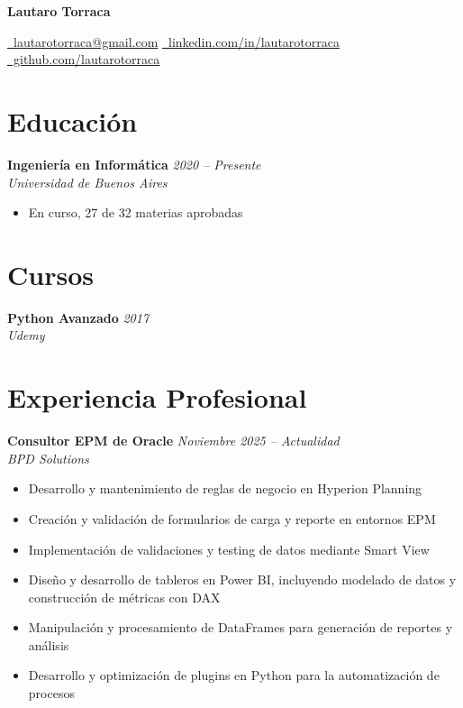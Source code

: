 \documentclass[10pt,a4paper]{article}
\newcommand{\cventry}[3]{%
  \textbf{#1} \hfill \textit{#3}\\[3pt]
  \textit{#2}%
}
\begin{document}
\begin{center}
  {\LARGE\bfseries Lautaro Torraca}

  \vspace{0.25cm}

  \href{mailto:lautarotorraca@gmail.com}
    {\faEnvelope\ lautarotorraca@gmail.com}
  \quad\textperiodcentered\quad
  \href{https://linkedin.com/in/lautarotorraca}
    {\faLinkedin\ linkedin.com/in/lautarotorraca}
  \quad\textperiodcentered\quad
  \href{https://github.com/lautarotorraca}
    {\faGithub\ github.com/lautarotorraca}
\end{center}

\section*{Educación}

\cventry{Ingeniería en Informática}{Universidad de Buenos Aires}{2020 -- Presente}
\begin{itemize}[leftmargin=*, noitemsep, topsep=3pt, itemsep=2pt]
  \item En curso, 27 de 32 materias aprobadas
\end{itemize}

\section*{Cursos}

\cventry{Python Avanzado}{Udemy}{2017}

\section*{Experiencia Profesional}

\cventry{Consultor EPM de Oracle}{BPD Solutions}{Noviembre 2025 -- Actualidad}
\begin{itemize}[leftmargin=*, noitemsep, topsep=3pt, itemsep=2pt]
  \item Desarrollo y mantenimiento de reglas de negocio en Hyperion Planning
  \item Creación y validación de formularios de carga y reporte en entornos EPM
  \item Implementación de validaciones y testing de datos mediante Smart View
  \item Diseño y desarrollo de tableros en Power BI, incluyendo modelado de datos
        y construcción de métricas con DAX
  \item Manipulación y procesamiento de DataFrames para generación de reportes
        y análisis
  \item Desarrollo y optimización de plugins en Python para la automatización
        de procesos
\end{itemize}
\end{document}
